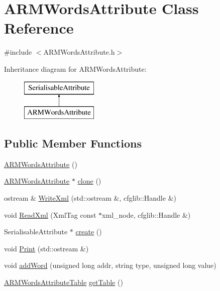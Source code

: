 \hypertarget{classARMWordsAttribute}{}\section{A\+R\+M\+Words\+Attribute Class Reference}
\label{classARMWordsAttribute}


{\ttfamily \#include $<$A\+R\+M\+Words\+Attribute.\+h$>$}

Inheritance diagram for A\+R\+M\+Words\+Attribute\+:\begin{figure}[H]
\begin{center}
\leavevmode
\includegraphics[height=2.000000cm]{classARMWordsAttribute}
\end{center}
\end{figure}
\subsection*{Public Member Functions}
\begin{DoxyCompactItemize}
\item 
\hyperlink{classARMWordsAttribute_a6e11470ad050e0fd7eeb7a094a543bcd}{A\+R\+M\+Words\+Attribute} ()
\item 
\hyperlink{classARMWordsAttribute}{A\+R\+M\+Words\+Attribute} $\ast$ \hyperlink{classARMWordsAttribute_af4ec429b5d88102773cc84de7d8dabcb}{clone} ()
\item 
ostream \& \hyperlink{classARMWordsAttribute_ad0061dc1aaa8a4a8264885f39798372c}{Write\+Xml} (std\+::ostream \&, cfglib\+::\+Handle \&)
\item 
void \hyperlink{classARMWordsAttribute_a661a7fbe6c6eab0a5e0c371525d92961}{Read\+Xml} (Xml\+Tag const $\ast$xml\+\_\+node, cfglib\+::\+Handle \&)
\item 
Serialisable\+Attribute $\ast$ \hyperlink{classARMWordsAttribute_a5989e2a2f17a9e9bfdcd76c0543e0720}{create} ()
\item 
void \hyperlink{classARMWordsAttribute_a6875eb117a936a45fbb6e90e3a2ecad9}{Print} (std\+::ostream \&)
\item 
void \hyperlink{classARMWordsAttribute_a9c5ac94cef5510b90dad76940413c2db}{add\+Word} (unsigned long addr, string type, unsigned long value)
\item 
\hyperlink{ARMWordsAttribute_8h_a7d589468d1898466a80161546d217fd6}{A\+R\+M\+Words\+Attribute\+Table} \hyperlink{classARMWordsAttribute_a6326d1ca018bc249d6dc28713af800a0}{get\+Table} ()
\end{DoxyCompactItemize}


